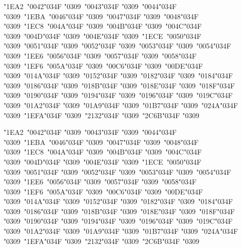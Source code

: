 \documentclass[10pt]{article}
\newcommand{\cgj}{\char"034F }
\begin{document}
\par\noindent{}\parbox[t]{\dimexpr\linewidth-2.4cm}{\PropB\fontsize{18}{30}\selectfont\raggedright {\color{pre}\char"1EA2}\ \char"0042\cgj\char"0309\ \char"0043\cgj\char"0309\ \char"0044\cgj\char"0309\ {\color{pre}\char"1EBA}\ \char"0046\cgj\char"0309\ \char"0047\cgj\char"0309\ \char"0048\cgj\char"0309\ {\color{pre}\char"1EC8}\ \char"004A\cgj\char"0309\ \char"004B\cgj\char"0309\ \char"004C\cgj\char"0309\ \char"004D\cgj\char"0309\ \char"004E\cgj\char"0309\ {\color{pre}\char"1ECE}\ \char"0050\cgj\char"0309\ \char"0051\cgj\char"0309\ \char"0052\cgj\char"0309\ \char"0053\cgj\char"0309\ \char"0054\cgj\char"0309\ {\color{pre}\char"1EE6}\ \char"0056\cgj\char"0309\ \char"0057\cgj\char"0309\ \char"0058\cgj\char"0309\ {\color{pre}\char"1EF6}\ \char"005A\cgj\char"0309\ \char"00C6\cgj\char"0309\ \char"00DE\cgj\char"0309\ \char"014A\cgj\char"0309\ \char"0152\cgj\char"0309\ \char"0182\cgj\char"0309\ \char"0184\cgj\char"0309\ \char"0186\cgj\char"0309\ \char"018B\cgj\char"0309\ \char"018E\cgj\char"0309\ \char"018F\cgj\char"0309\ \char"0190\cgj\char"0309\ \char"0194\cgj\char"0309\ \char"0196\cgj\char"0309\ \char"019C\cgj\char"0309\ \char"01A2\cgj\char"0309\ \char"01A9\cgj\char"0309\ \char"01B7\cgj\char"0309\ \char"024A\cgj\char"0309\ \char"1EFA\cgj\char"0309\ \char"2132\cgj\char"0309\ \char"2C6B\cgj\char"0309}\par
\par\noindent{}\parbox[t]{\dimexpr\linewidth-2.4cm}{\PropBI\fontsize{18}{30}\selectfont\raggedright {\color{pre}\char"1EA2}\ \char"0042\cgj\char"0309\ \char"0043\cgj\char"0309\ \char"0044\cgj\char"0309\ {\color{pre}\char"1EBA}\ \char"0046\cgj\char"0309\ \char"0047\cgj\char"0309\ \char"0048\cgj\char"0309\ {\color{pre}\char"1EC8}\ \char"004A\cgj\char"0309\ \char"004B\cgj\char"0309\ \char"004C\cgj\char"0309\ \char"004D\cgj\char"0309\ \char"004E\cgj\char"0309\ {\color{pre}\char"1ECE}\ \char"0050\cgj\char"0309\ \char"0051\cgj\char"0309\ \char"0052\cgj\char"0309\ \char"0053\cgj\char"0309\ \char"0054\cgj\char"0309\ {\color{pre}\char"1EE6}\ \char"0056\cgj\char"0309\ \char"0057\cgj\char"0309\ \char"0058\cgj\char"0309\ {\color{pre}\char"1EF6}\ \char"005A\cgj\char"0309\ \char"00C6\cgj\char"0309\ \char"00DE\cgj\char"0309\ \char"014A\cgj\char"0309\ \char"0152\cgj\char"0309\ \char"0182\cgj\char"0309\ \char"0184\cgj\char"0309\ \char"0186\cgj\char"0309\ \char"018B\cgj\char"0309\ \char"018E\cgj\char"0309\ \char"018F\cgj\char"0309\ \char"0190\cgj\char"0309\ \char"0194\cgj\char"0309\ \char"0196\cgj\char"0309\ \char"019C\cgj\char"0309\ \char"01A2\cgj\char"0309\ \char"01A9\cgj\char"0309\ \char"01B7\cgj\char"0309\ \char"024A\cgj\char"0309\ \char"1EFA\cgj\char"0309\ \char"2132\cgj\char"0309\ \char"2C6B\cgj\char"0309}\par
\end{document}
